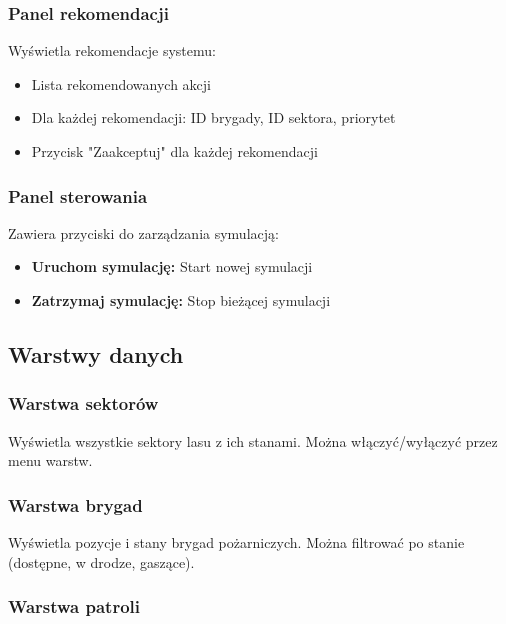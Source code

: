 \subsubsection{Panel rekomendacji}

Wyświetla rekomendacje systemu:

\begin{itemize}
    \item Lista rekomendowanych akcji
    \item Dla każdej rekomendacji: ID brygady, ID sektora, priorytet
    \item Przycisk "Zaakceptuj" dla każdej rekomendacji
\end{itemize}

\subsubsection{Panel sterowania}

Zawiera przyciski do zarządzania symulacją:

\begin{itemize}
    \item \textbf{Uruchom symulację:} Start nowej symulacji
    \item \textbf{Zatrzymaj symulację:} Stop bieżącej symulacji
\end{itemize}

\subsection{Warstwy danych}

\subsubsection{Warstwa sektorów}

Wyświetla wszystkie sektory lasu z ich stanami. Można włączyć/wyłączyć przez menu warstw.

\subsubsection{Warstwa brygad}

Wyświetla pozycje i stany brygad pożarniczych. Można filtrować po stanie (dostępne, w drodze, gaszące).

\subsubsection{Warstwa patroli}

